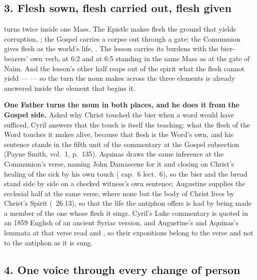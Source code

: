 \subsection*{3. Flesh sown, flesh carried out, flesh given}

 turns twice inside one Mass. The Epistle makes flesh the ground that
yields corruption, ; the Gospel carries a
corpse out through a gate; the Communion gives flesh as the world's life,
. The lesson carries its burdens with the
bier-bearers' own verb,  at 6:2 and  at
6:5 standing in the same Mass as  at the gate of
Naim. And the lesson's other half reaps out of the spirit what the flesh cannot
yield ---  ---
so the turn the noun makes across the three elements is already answered inside
the element that begins it.

\textbf{One Father turns the noun in both places, and he does it from the Gospel
side.} Asked why Christ touched the bier when a word would have sufficed, Cyril
answers that the touch is itself the teaching: what the flesh of the Word
touches it makes alive, because that flesh is the Word's own, and his
sentence stands
\ifdefined\TriptychSynthesisEdition
in the fifth unit of the commentary%
\else
at the Gospel subsection%
\fi{} (Payne Smith, vol.~1, p.~135). Aquinas
draws the same inference at the Communion's verse, naming John Damascene for it
and closing on Christ's healing of the sick by his own touch ( cap.~6 lect.~6), so the bier and
the bread stand side by side on a checked witness's own sentence; Augustine
supplies the ecclesial half at the same verse, where none but the body of Christ
lives by Christ's Spirit (~26.13), so that the life the
antiphon offers is had by being made a member of the one whose flesh it sings. Cyril's Luke commentary
is quoted in
an 1859 English of an ancient Syriac version, and Augustine's and Aquinas's
lemmata at that verse read  and , so their
expositions belong to the verse and not to the antiphon as it is sung.

\subsection*{4. One voice through every change of person}


